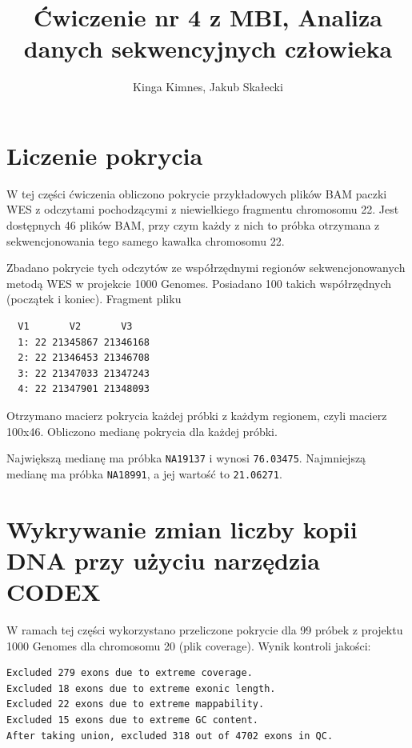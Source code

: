 \documentclass[a4paper]{article}
\begin{document}
\title{Ćwiczenie nr 4 z MBI, Analiza danych sekwencyjnych człowieka}
\author{Kinga Kimnes, Jakub Skałecki}
\maketitle

\section{Liczenie pokrycia}


W tej części ćwiczenia obliczono pokrycie przykładowych plików BAM paczki WES z odczytami pochodzącymi z niewielkiego fragmentu chromosomu 22. Jest dostępnych 46 plików BAM, przy czym każdy z nich to próbka otrzymana z sekwencjonowania tego samego kawałka chromosomu 22.

Zbadano pokrycie tych odczytów ze współrzędnymi regionów sekwencjonowanych metodą WES w projekcie 1000 Genomes. Posiadano 100 takich współrzędnych (początek i koniec). Fragment pliku 

\begin{verbatim}
  V1       V2       V3
  1: 22 21345867 21346168
  2: 22 21346453 21346708
  3: 22 21347033 21347243
  4: 22 21347901 21348093
\end{verbatim}

Otrzymano macierz pokrycia każdej próbki z każdym regionem, czyli macierz 100x46. Obliczono medianę pokrycia dla każdej próbki.

Największą medianę ma próbka \texttt{NA19137} i wynosi \texttt{76.03475}.
Najmniejszą medianę ma próbka \texttt{NA18991}, a jej wartość to \texttt{21.06271}.


\section{Wykrywanie zmian liczby kopii DNA przy użyciu narzędzia CODEX}

W ramach tej części wykorzystano przeliczone pokrycie dla 99 próbek z projektu 1000 Genomes dla chromosomu 20 (plik coverage). Wynik kontroli jakości:

\begin{verbatim}
Excluded 279 exons due to extreme coverage.
Excluded 18 exons due to extreme exonic length.
Excluded 22 exons due to extreme mappability.
Excluded 15 exons due to extreme GC content.
After taking union, excluded 318 out of 4702 exons in QC.
\end{verbatim}
\end{document}

